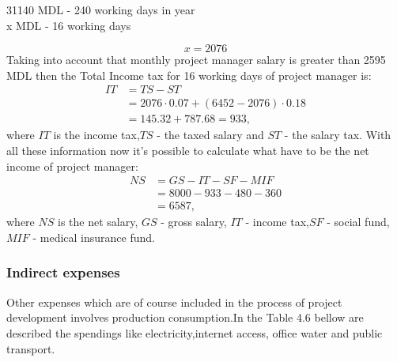 \begin{center}
	31140 MDL - 240 working days in year\\
	x MDL     - 16 working days\\
\end{center}
\begin{equation}
x = 2076
\end{equation}
Taking into account that monthly project manager salary is greater than 2595 MDL then the Total Income tax for 16 working days of project manager is:
\begin{equation}
\begin{split}
IT &= TS - ST \\
&= 2076 \cdot 0.07 + (6452 - 2076) \cdot 0.18 \\
& = 145.32 + 787.68 = 933,
\end{split}
\end{equation}
where $IT$ is the income tax,$TS$ - the taxed salary and $ST$ - the salary tax.
With all these information now it's possible to calculate what have to be the net income of project manager:
\begin{equation}
\begin{split}
NS &= GS - IT - SF - MIF \\
&= 8000 - 933 - 480 - 360 \\
&= 6587,
\end{split}
\end{equation}
where $NS$ is the net salary, $GS$ - gross salary, $IT$ - income tax,$SF$ - social fund, $MIF$ - medical insurance fund.
\subsubsection{Indirect expenses}
Other expenses which are of course included in the process of project development involves production consumption.In the Table 4.6 bellow are described the spendings like electricity,internet access, office water and public transport.
\begin{table}[H]
	\centering
	\caption{Indirect expenses}
	\label{my-label}
\end{table}
